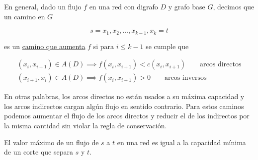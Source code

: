En general, dado un flujo $f$ en una red con digrafo $D$ y grafo base $G$, decimos que un camino en $G$

\[
s=x_1,x_2,\dots,x_{k-1},x_k=t
\]

\noindent es un \ul{camino que aumenta} $f$ si para $i \leq k-1$ se cumple que

\begin{gather*}
    (x_i, x_{i+1}) \in A(D) \implies f(x_i,x_{i+1}) < c(x_i,x_{i+1}) \qquad \text{arcos directos} \\
    (x_{i+1}, x_i) \in A(D) \implies f(x_i,x_{i+1}) > 0 \qquad \text{arcos inversos}
\end{gather*}

En otras palabras, los arcos directos no están usados a su máxima capacidad y los arcos indirectos cargan algún flujo en sentido contrario. Para estos caminos podemos aumentar el flujo de los arcos directos y reducir el de los indirectos por la misma cantidad sin violar la regla de conservación.

\begin{teo}\label{teo:minmax}
    El valor máximo de un flujo de $s$ a $t$ en una red es igual a la capacidad mínima de un corte que separa $s$ y $t$.
\end{teo}

